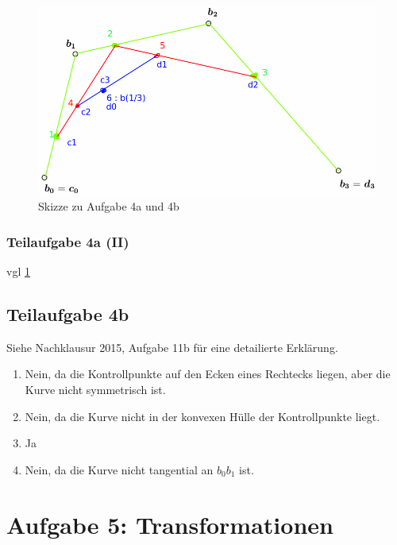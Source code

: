 \documentclass[a4paper]{scrartcl}
\begin{document}
\begin{figure}[h]
    \centering
    \includegraphics*[width=0.8\linewidth, keepaspectratio]{4ab.png}
    \caption{Skizze zu Aufgabe 4a und 4b}
    \label{fig:4ab}
\end{figure}

\subsubsection*{Teilaufgabe 4a (II)}
vgl \cref{fig:4ab}

\subsection*{Teilaufgabe 4b}
Siehe Nachklausur 2015, Aufgabe 11b für eine detailierte Erklärung.

\begin{enumerate}
    \item Nein, da die Kontrollpunkte auf den Ecken eines Rechtecks liegen,
          aber die Kurve nicht symmetrisch ist.
    \item Nein, da die Kurve nicht in der konvexen Hülle der Kontrollpunkte
          liegt.
    \item Ja
    \item Nein, da die Kurve nicht tangential an $b_0 b_1$ ist.
\end{enumerate}

\section*{Aufgabe 5: Transformationen}

\end{document}
